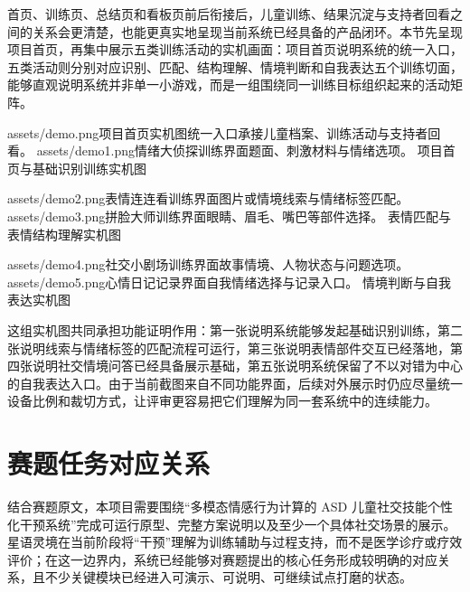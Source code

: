 首页、训练页、总结页和看板页前后衔接后，儿童训练、结果沉淀与支持者回看之间的关系会更清楚，也能更真实地呈现当前系统已经具备的产品闭环。本节先呈现项目首页，再集中展示五类训练活动的实机画面：项目首页说明系统的统一入口，五类活动则分别对应识别、匹配、结构理解、情境判断和自我表达五个训练切面，能够直观说明系统并非单一小游戏，而是一组围绕同一训练目标组织起来的活动矩阵。

\ActivityDemoPair
  {assets/demo.png}{项目首页实机图}{统一入口承接儿童档案、训练活动与支持者回看。}
  {assets/demo1.png}{情绪大侦探训练界面}{题面、刺激材料与情绪选项。}
  {项目首页与基础识别训练实机图}

\ActivityDemoPair
  {assets/demo2.png}{表情连连看训练界面}{图片或情境线索与情绪标签匹配。}
  {assets/demo3.png}{拼脸大师训练界面}{眼睛、眉毛、嘴巴等部件选择。}
  {表情匹配与表情结构理解实机图}

\ActivityDemoPair
  {assets/demo4.png}{社交小剧场训练界面}{故事情境、人物状态与问题选项。}
  {assets/demo5.png}{心情日记记录界面}{自我情绪选择与记录入口。}
  {情境判断与自我表达实机图}

这组实机图共同承担功能证明作用：第一张说明系统能够发起基础识别训练，第二张说明线索与情绪标签的匹配流程可运行，第三张说明表情部件交互已经落地，第四张说明社交情境问答已经具备展示基础，第五张说明系统保留了不以对错为中心的自我表达入口。由于当前截图来自不同功能界面，后续对外展示时仍应尽量统一设备比例和裁切方式，让评审更容易把它们理解为同一套系统中的连续能力。

\section{赛题任务对应关系}
结合赛题原文，本项目需要围绕“多模态情感行为计算的 ASD 儿童社交技能个性化干预系统”完成可运行原型、完整方案说明以及至少一个具体社交场景的展示。星语灵境在当前阶段将“干预”理解为训练辅助与过程支持，而不是医学诊疗或疗效评价；在这一边界内，系统已经能够对赛题提出的核心任务形成较明确的对应关系，且不少关键模块已经进入可演示、可说明、可继续试点打磨的状态。

